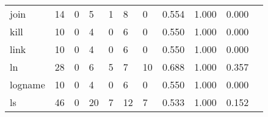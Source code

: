 \begin{longtable}{lp{1.2cm}p{1.2cm}p{1.2cm}p{1.2cm}p{1.2cm}p{1.2cm}p{1.2cm}p{1.2cm}p{1.2cm}p{1.2cm}}
join      &                                    14 &                                                  0 &                                                  5 &                                                  1 &                                                  8 &                                                  0 &                                         0.554 &                                              1.000 &                                              0.000 \\
kill      &                                    10 &                                                  0 &                                                  4 &                                                  0 &                                                  6 &                                                  0 &                                         0.550 &                                              1.000 &                                              0.000 \\
link      &                                    10 &                                                  0 &                                                  4 &                                                  0 &                                                  6 &                                                  0 &                                         0.550 &                                              1.000 &                                              0.000 \\
ln        &                                    28 &                                                  0 &                                                  6 &                                                  5 &                                                  7 &                                                 10 &                                         0.688 &                                              1.000 &                                              0.357 \\
logname   &                                    10 &                                                  0 &                                                  4 &                                                  0 &                                                  6 &                                                  0 &                                         0.550 &                                              1.000 &                                              0.000 \\
ls        &                                    46 &                                                  0 &                                                 20 &                                                  7 &                                                 12 &                                                  7 &                                         0.533 &                                              1.000 &                                              0.152 \\

\end{longtable}
